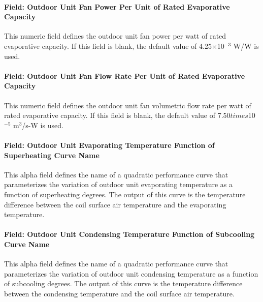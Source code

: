 \paragraph{Field: Outdoor Unit Fan Power Per Unit of Rated Evaporative Capacity}\label{field-outdoor-unit-fan-power-per-unit-of-rated-evaporative-capacity}

This numeric field defines the outdoor unit fan power per watt of rated evaporative capacity. If this field is blank, the default value of 4.25$\times$10$^{-3}$ W/W is used.

\paragraph{Field: Outdoor Unit Fan Flow Rate Per Unit of Rated Evaporative Capacity}\label{field-outdoor-unit-fan-flow-rate-per-unit-of-rated-evaporative-capacity}

This numeric field defines the outdoor unit fan volumetric flow rate per watt of rated evaporative capacity. If this field is blank, the default value of 7.50$times$10$^{-5}$ m\(^{3}\)/s-W is used.

\paragraph{Field: Outdoor Unit Evaporating Temperature Function of Superheating Curve Name}\label{field-outdoor-unit-evaporating-temperature-function-of-superheating-curve-name}

This alpha field defines the name of a quadratic performance curve that parameterizes the variation of outdoor unit evaporating temperature as a function of superheating degrees. The output of this curve is the temperature difference between the coil surface air temperature and the evaporating temperature.

\paragraph{Field: Outdoor Unit Condensing Temperature Function of Subcooling Curve Name}\label{field-outdoor-unit-condensing-temperature-function-of-subcooling-curve-name}

This alpha field defines the name of a quadratic performance curve that parameterizes the variation of outdoor unit condensing temperature as a function of subcooling degrees. The output of this curve is the temperature difference between the condensing temperature and the coil surface air temperature.

